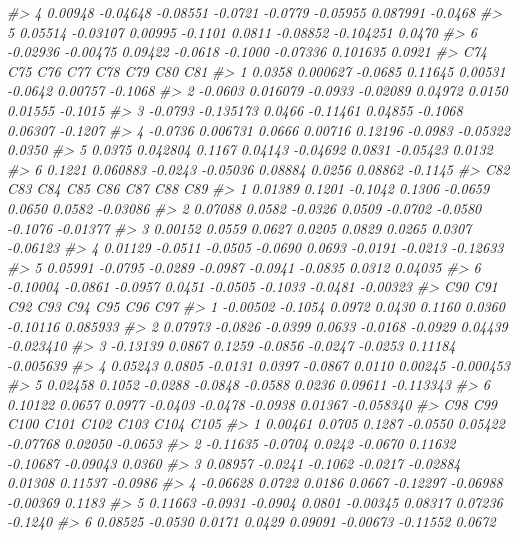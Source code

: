 \documentclass[]{book}
\newenvironment{Shaded}{\begin{snugshade}}{\end{snugshade}}
\newcommand{\CommentTok}[1]{\textcolor[rgb]{0.56,0.35,0.01}{\textit{#1}}}
\begin{document}
\begin{Shaded}
\begin{Highlighting}[]
{{{{{\CommentTok{#> 4  0.00948 -0.04648 -0.08551 -0.0721 -0.0779 -0.05955  0.087991 -0.0468}
\CommentTok{#> 5  0.05514 -0.03107  0.00995 -0.1101  0.0811 -0.08852 -0.104251  0.0470}
\CommentTok{#> 6 -0.02936 -0.00475  0.09422 -0.0618 -0.1000 -0.07336  0.101635  0.0921}
\CommentTok{#>       C74       C75     C76      C77      C78     C79      C80     C81}
\CommentTok{#> 1  0.0358  0.000627 -0.0685  0.11645  0.00531 -0.0642  0.00757 -0.1068}
\CommentTok{#> 2 -0.0603  0.016079 -0.0933 -0.02089  0.04972  0.0150  0.01555 -0.1015}
\CommentTok{#> 3 -0.0793 -0.135173  0.0466 -0.11461  0.04855 -0.1068  0.06307 -0.1207}
\CommentTok{#> 4 -0.0736  0.006731  0.0666  0.00716  0.12196 -0.0983 -0.05322  0.0350}
\CommentTok{#> 5  0.0375  0.042804  0.1167  0.04143 -0.04692  0.0831 -0.05423  0.0132}
\CommentTok{#> 6  0.1221  0.060883 -0.0243 -0.05036  0.08884  0.0256  0.08862 -0.1145}
\CommentTok{#>        C82     C83     C84     C85     C86     C87     C88      C89}
\CommentTok{#> 1  0.01389  0.1201 -0.1042  0.1306 -0.0659  0.0650  0.0582 -0.03086}
\CommentTok{#> 2  0.07088  0.0582 -0.0326  0.0509 -0.0702 -0.0580 -0.1076 -0.01377}
\CommentTok{#> 3  0.00152  0.0559  0.0627  0.0205  0.0829  0.0265  0.0307 -0.06123}
\CommentTok{#> 4  0.01129 -0.0511 -0.0505 -0.0690  0.0693 -0.0191 -0.0213 -0.12633}
\CommentTok{#> 5  0.05991 -0.0795 -0.0289 -0.0987 -0.0941 -0.0835  0.0312  0.04035}
\CommentTok{#> 6 -0.10004 -0.0861 -0.0957  0.0451 -0.0505 -0.1033 -0.0481 -0.00323}
\CommentTok{#>        C90     C91     C92     C93     C94     C95      C96       C97}
\CommentTok{#> 1 -0.00502 -0.1054  0.0972  0.0430  0.1160  0.0360 -0.10116  0.085933}
\CommentTok{#> 2  0.07973 -0.0826 -0.0399  0.0633 -0.0168 -0.0929  0.04439 -0.023410}
\CommentTok{#> 3 -0.13139  0.0867  0.1259 -0.0856 -0.0247 -0.0253  0.11184 -0.005639}
\CommentTok{#> 4  0.05243  0.0805 -0.0131  0.0397 -0.0867  0.0110  0.00245 -0.000453}
\CommentTok{#> 5  0.02458  0.1052 -0.0288 -0.0848 -0.0588  0.0236  0.09611 -0.113343}
\CommentTok{#> 6  0.10122  0.0657  0.0977 -0.0403 -0.0478 -0.0938  0.01367 -0.058340}
\CommentTok{#>        C98     C99    C100    C101     C102     C103     C104    C105}
\CommentTok{#> 1  0.00461  0.0705  0.1287 -0.0550  0.05422 -0.07768  0.02050 -0.0653}
\CommentTok{#> 2 -0.11635 -0.0704  0.0242 -0.0670  0.11632 -0.10687 -0.09043  0.0360}
\CommentTok{#> 3  0.08957 -0.0241 -0.1062 -0.0217 -0.02884  0.01308  0.11537 -0.0986}
\CommentTok{#> 4 -0.06628  0.0722  0.0186  0.0667 -0.12297 -0.06988 -0.00369  0.1183}
\CommentTok{#> 5  0.11663 -0.0931 -0.0904  0.0801 -0.00345  0.08317  0.07236 -0.1240}
\CommentTok{#> 6  0.08525 -0.0530  0.0171  0.0429  0.09091 -0.00673 -0.11552  0.0672}
}}}}}
\end{Highlighting}
\end{Shaded}
\end{document}
